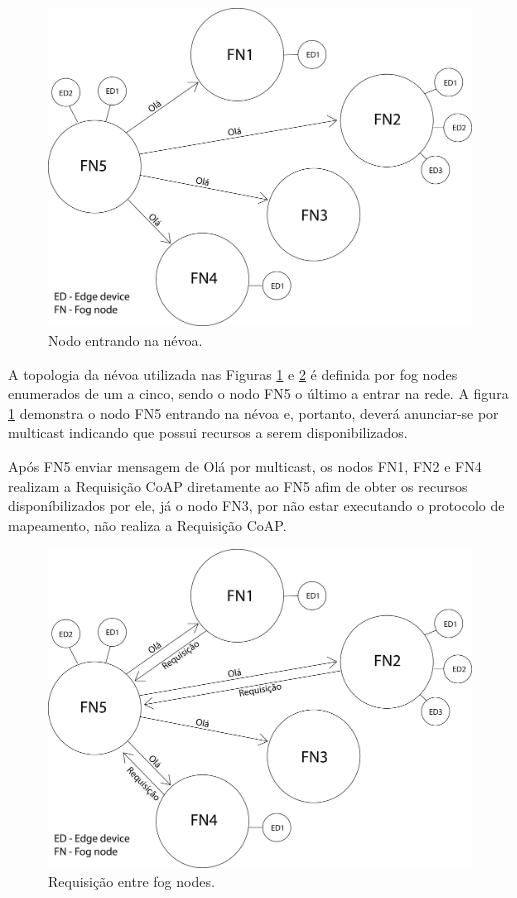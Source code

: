 \begin{figure}[H]
    \centering\includegraphics[width=.8\textwidth]{fig5.png}
    \caption[Nodo entrando na névoa]
    {\label{fig:fig5} Nodo entrando na névoa.}
\end{figure}

A topologia da névoa utilizada nas Figuras \ref{fig:fig5} e \ref{fig:fig6} é definida por fog nodes enumerados de um a cinco, sendo o nodo FN5 o último a entrar na rede.
A figura \ref{fig:fig5} demonstra o nodo FN5 entrando na névoa e, portanto, deverá anunciar-se por multicast indicando que possui recursos a serem disponibilizados.

Após FN5 enviar mensagem de Olá por multicast, os nodos FN1, FN2 e FN4 realizam a Requisição CoAP diretamente ao FN5 afim de obter os recursos disponíbilizados por ele,
já o nodo FN3, por não estar executando o protocolo de mapeamento, não realiza a Requisição CoAP.

\begin{figure}[H]
    \centering\includegraphics[width=.8\textwidth]{fig6.png}
    \caption [Requisição entre fog nodes]
    {\label{fig:fig6} Requisição entre fog nodes.}
\end{figure}


